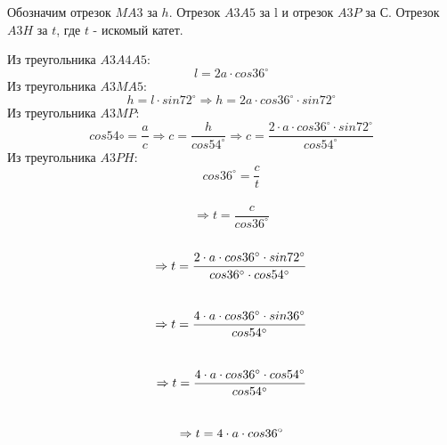 \solutionSection

Обозначим отрезок $MA3$ за $h$. Отрезок $A3A5$ за l и отрезок $A3P$ за $С$. Отрезок $A3H$ за $t$, где $t$ - искомый катет.


Из треугольника $A3A4A5$:\\
\begin{displaymath} l= 2a \cdot cos36^{\circ} \end{displaymath}
Из треугольника $A3MA5$:\\
\begin{displaymath} h= l \cdot sin72^{\circ}
\Rightarrow
h= 2a \cdot cos36^{\circ}  \cdot sin72^{\circ} 
\end{displaymath}
Из треугольника $A3MP$: 
\begin{displaymath} 
cos54{\circ}= \frac{a}{c}
\Rightarrow
c = \frac{h}{cos54^{\circ}}
\Rightarrow
c = \frac{2 \cdot a \cdot cos36^{\circ} \cdot sin72^{\circ}}{cos54^{\circ}}
\end{displaymath}
Из треугольника $A3PH$: \\
\begin{displaymath} 
cos36^{\circ} = \frac{c}{t} 
\end{displaymath} \\
\begin{displaymath} 
\Rightarrow
t =  \frac{c}{cos36^{\circ}}
\end{displaymath}\\
\begin{displaymath} 
\Rightarrow
t =  \frac{2 \cdot a \cdot cos36^{\circ} \cdot  sin72^{\circ} }{cos36^{\circ} \cdot cos54^{\circ}}\\
\end{displaymath}\\
\begin{displaymath} 
\Rightarrow
t =  \frac{4 \cdot a \cdot cos36^{\circ} \cdot sin36^{\circ} }{cos54^{\circ}}\\
\end{displaymath}\\
\begin{displaymath} 
\Rightarrow
t =  \frac{4 \cdot a \cdot cos36^{\circ} \cdot cos54^{\circ} }{cos54^{\circ}}\\
\end{displaymath} \\
\begin{displaymath} 
\Rightarrow
t = 4 \cdot a \cdot cos36^{\circ}\\
\end{displaymath}\\

